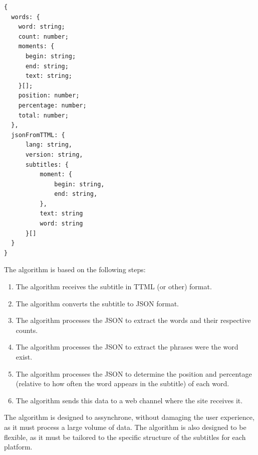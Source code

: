 \documentclass[12pt]{article}
\begin{document}
\begin{verbatim}
{
  words: {    
    word: string;
    count: number;
    moments: {
      begin: string;
      end: string;
      text: string;
    }[];
    position: number;
    percentage: number;
    total: number;
  },
  jsonFromTTML: {
      lang: string,
      version: string,
      subtitles: {
          moment: {
              begin: string,
              end: string,
          },
          text: string
          word: string
      }[]
  }
}
\end{verbatim}
The algorithm is based on the following steps:
\begin{enumerate}
  \item The algorithm receives the subtitle in TTML (or other) format.
  \item The algorithm converts the subtitle to JSON format.
  \item The algorithm processes the JSON to extract the words and their respective counts.
  \item The algorithm processes the JSON to extract the phrases were the word exist.
  \item The algorithm processes the JSON to determine the position and percentage (relative to how often the word appears in the subtitle) of each word.
  \item The algorithm sends this data to a web channel where the site receives it.
  \end{enumerate}
The algorithm is designed to assynchrone, without damaging the user experience, as it must process a large volume of data. The algorithm is also designed to be flexible, as it must be tailored to the specific structure of the subtitles for each platform. \\
\end{document}
